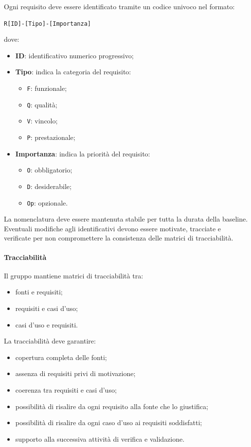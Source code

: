 Ogni requisito deve essere identificato tramite un codice univoco nel formato:

\begin{center}
\texttt{R[ID]-[Tipo]-[Importanza]}
\end{center}

dove:
\begin{itemize}
    \item \textbf{ID}: identificativo numerico progressivo;
    \item \textbf{Tipo}: indica la categoria del requisito:
    \begin{itemize}
        \item \texttt{F}: funzionale;
        \item \texttt{Q}: qualità;
        \item \texttt{V}: vincolo;
        \item \texttt{P}: prestazionale;
    \end{itemize}
    \item \textbf{Importanza}: indica la priorità del requisito:
    \begin{itemize}
        \item \texttt{O}: obbligatorio;
        \item \texttt{D}: desiderabile;
        \item \texttt{Op}: opzionale.
    \end{itemize}
\end{itemize}

La nomenclatura deve essere mantenuta stabile per tutta la durata della baseline.
Eventuali modifiche agli identificativi devono essere motivate, tracciate e
verificate per non compromettere la consistenza delle matrici di tracciabilità.

\paragraph{Tracciabilità}

Il gruppo mantiene matrici di tracciabilità tra:

\begin{itemize}
    \item fonti e requisiti;
    \item requisiti e casi d'uso;
    \item casi d'uso e requisiti.
\end{itemize}

La tracciabilità deve garantire:

\begin{itemize}
    \item copertura completa delle fonti;
    \item assenza di requisiti privi di motivazione;
    \item coerenza tra requisiti e casi d'uso;
    \item possibilità di risalire da ogni requisito alla fonte che lo giustifica;
    \item possibilità di risalire da ogni caso d'uso ai requisiti soddisfatti;
    \item supporto alla successiva attività di verifica e validazione.
\end{itemize}

